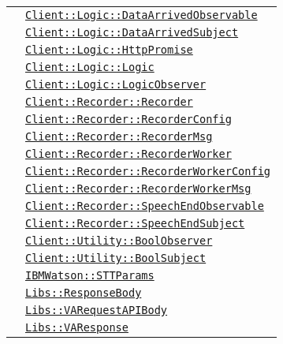 \begin{longtable}{|>{\centering}m{3cm}|m{10cm}<{\centering}|}
& \hyperref[Client::Logic::DataArrivedObservable]{\texttt{Client::Logic::DataArrivedObservable}}\\
& \hyperref[Client::Logic::DataArrivedSubject]{\texttt{Client::Logic::DataArrivedSubject}}\\
& \hyperref[Client::Logic::HttpPromise]{\texttt{Client::Logic::HttpPromise}}\\
& \hyperref[Client::Logic::Logic]{\texttt{Client::Logic::Logic}}\\
& \hyperref[Client::Logic::LogicObserver]{\texttt{Client::Logic::LogicObserver}}\\
& \hyperref[Client::Recorder::Recorder]{\texttt{Client::Recorder::Recorder}}\\
& \hyperref[Client::Recorder::RecorderConfig]{\texttt{Client::Recorder::RecorderConfig}}\\
& \hyperref[Client::Recorder::RecorderMsg]{\texttt{Client::Recorder::RecorderMsg}}\\
& \hyperref[Client::Recorder::RecorderWorker]{\texttt{Client::Recorder::RecorderWorker}}\\
& \hyperref[Client::Recorder::RecorderWorkerConfig]{\texttt{Client::Recorder::RecorderWorkerConfig}}\\
& \hyperref[Client::Recorder::RecorderWorkerMsg]{\texttt{Client::Recorder::RecorderWorkerMsg}}\\
& \hyperref[Client::Recorder::SpeechEndObservable]{\texttt{Client::Recorder::SpeechEndObservable}}\\
& \hyperref[Client::Recorder::SpeechEndSubject]{\texttt{Client::Recorder::SpeechEndSubject}}\\
& \hyperref[Client::Utility::BoolObserver]{\texttt{Client::Utility::BoolObserver}}\\
& \hyperref[Client::Utility::BoolSubject]{\texttt{Client::Utility::BoolSubject}}\\
& \hyperref[IBMWatson::STTParams]{\texttt{IBMWatson::STTParams}}\\
& \hyperref[Libs::ResponseBody]{\texttt{Libs::ResponseBody}}\\
& \hyperref[Libs::VARequestAPIBody]{\texttt{Libs::VARequestAPIBody}}\\
& \hyperref[Libs::VAResponse]{\texttt{Libs::VAResponse}}\\ \hline


\end{longtable}
